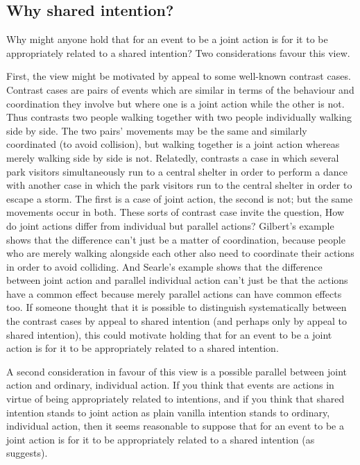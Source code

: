 \documentclass[12pt,\papersize]{extarticle}
\begin{document}
\subsection{Why shared intention?}
Why might anyone hold that for an event to be a joint action is for it to be appropriately related to a shared intention?
Two considerations favour this view.

First, the view might be motivated by appeal to some well-known contrast cases.
Contrast cases are pairs of events which are similar in terms of the behaviour and coordination they involve but where one is a joint action while the other is not.  
Thus \citet{gilbert_walking_1990} contrasts two people walking together with two people individually walking side by side.  
The two pairs' movements may be the same and similarly coordinated (to avoid collision), but walking together is a joint action whereas merely walking side by side is not. 
Relatedly,  \citet{Searle:1990em}  contrasts a case in which several park visitors simultaneously run to a central shelter in order to perform a dance with another case in which the park visitors run to the central shelter in order to escape a storm.  The first is a case of joint action, the second is not; but the same movements occur in both.  
These sorts of contrast case invite the question, 
How do joint actions differ from individual but parallel actions? 
Gilbert’s example shows that the difference can’t just be a matter of coordination, because people who are merely walking alongside each other also need to coordinate their actions in order to avoid colliding.  
And Searle’s example shows that the difference between joint action and parallel individual action can’t just be that the actions have a common effect because merely parallel actions can have common effects too. 
If someone thought that it is possible to distinguish systematically between the contrast cases by appeal to shared intention (and perhaps only by appeal to shared intention), this could motivate holding that for an event to be a joint action is for it to be appropriately related to a shared intention.

{\label{text:second_consideration} A second consideration} in favour of this view is a possible parallel between joint action and ordinary, individual action.
If you think that events are actions in virtue of being appropriately related to intentions, 
and if you think that shared intention stands to joint action as plain vanilla intention stands to ordinary, individual action,
then it seems reasonable to suppose that for an event to be a joint action is for it to be appropriately related to a shared intention (as \citealp{Pacherie:2012fk} suggests).
\end{document}
